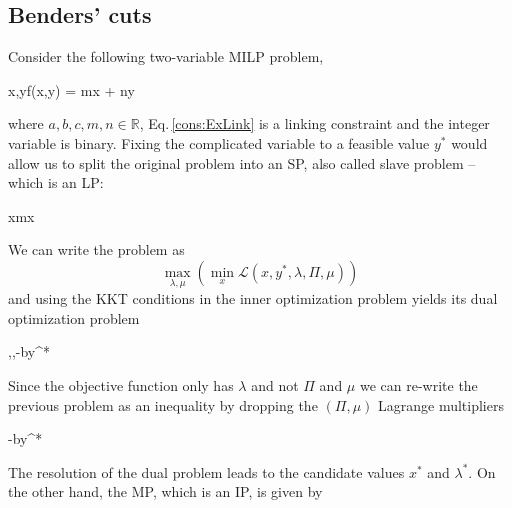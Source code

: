 \subsection{Benders' cuts}
Consider the following two-variable MILP problem,
\begin{mini!}[2]
	{x,y}{f(x,y) = mx + ny}{}{}{\quad {}}
\end{mini!}
where $a,b,c,m,n \in \mathbb{R}$, Eq.\,\eqref{cons:ExLink} is a linking constraint and the integer variable is binary. Fixing the complicated variable to a feasible value $y^{*}$ would allow us to split the original problem into an SP, also called slave problem -- which is an LP:
\begin{tcolorbox}[colback=red!5!white,colframe=red!75!black,title=Slave problem]
\begin{mini!}[2]
	{x}{\alpha \equiv mx}{}{}{}
\end{mini!}
\end{tcolorbox}
We can write the problem as
\begin{equation}
    \max_{\lambda,\mu}\left(\min_{x}\mathcal{L}(x,y^{*},\lambda,\Pi,\mu)\right)
\end{equation}
and using the KKT conditions in the inner optimization problem yields its dual optimization problem
\begin{maxi!}[2]
	{\lambda,\Pi,\mu}{-by^{*}\lambda}{}{}{}
\end{maxi!}
Since the objective function only has $\lambda$ and not $\Pi$ and $\mu$ we can re-write the previous problem as an inequality by dropping the $(\Pi,\mu)$ Lagrange multipliers
\begin{tcolorbox}[colback=red!5!white,colframe=red!75!black,title=Dual formulation of slave problem]
\begin{maxi!}[2]
	{\lambda}{-by^{*}\lambda}{}{}{}
\end{maxi!}
\end{tcolorbox}
The resolution of the dual problem leads to the candidate values $x^{*}$ and $\lambda^{*}$. On the other hand, the MP, which is an IP, is given by
